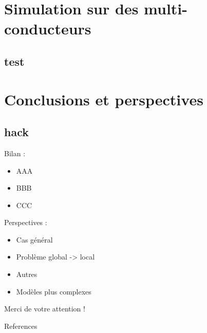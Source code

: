 \documentclass[compress, hyperref={unicode, bookmarks=true}]{beamer}
\begin{document}
\section[Simulations]{Simulation sur des multi-conducteurs}
\subsection{test}






\section{Conclusions et perspectives}
\subsection{hack}
\begin{frame}
  Bilan :
  \begin{itemize}
    \item AAA
    \item BBB
    \item CCC
  \end{itemize}
  \vspace{1cm}
  \pause
  Perspectives :
  \begin{itemize}
    \item Cas g\'en\'eral
    \item Probl\`eme global -> local
    \item Autres
    \item Modèles plus complexes
  \end{itemize}
\end{frame}


\begin{frame}
\begin{center}
\Huge Merci de votre attention !
\end{center}
\end{frame}


\begin{frame}[allowframebreaks]{References}
  \vspace{-0.05\textheight}
  \scriptsize
  
  
\end{frame}
\end{document}
